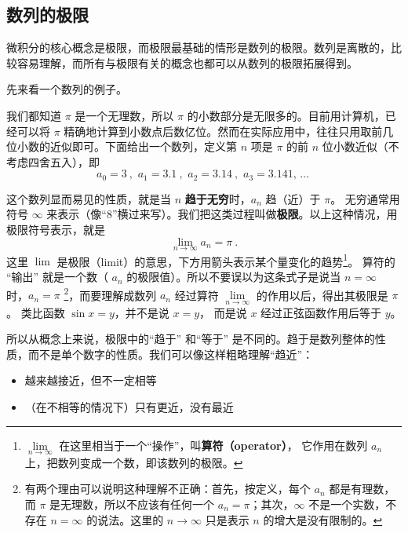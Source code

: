 

\subsection{数列的极限}

微积分的核心概念是极限，而极限最基础的情形是数列的极限。数列是离散的，比较容易理解，而所有与极限有关的概念也都可以从数列的极限拓展得到。

先来看一个数列的例子。

\begin{example}{}\label{ex_Lim_1}
我们都知道 $\pi$ 是一个无理数，所以 $\pi$ 的小数部分是无限多的。目前用计算机，已经可以将 $\pi$ 精确地计算到小数点后数亿位。然而在实际应用中，往往只用取前几位小数的近似即可。下面给出一个数列，定义第 $n$ 项是 $\pi$ 的前 $n$ 位小数近似（不考虑四舍五入），即
\begin{equation}
a_0 = 3~,\,\, a_1 = 3.1~,\,\, a_2 = 3.14~,\,\, a_3 = 3.141,\,\dots~
\end{equation}
\end{example}

这个数列显而易见的性质，就是当 $n$ \textbf{趋于无穷}时，$a_n$ 趋（近）于 $\pi$。 无穷通常用符号 $\infty$ 来表示（像“8”横过来写）。我们把这类过程叫做\textbf{极限}。以上这种情况，用极限符号表示，就是
\begin{equation}
\lim_{n \to \infty } {a_n} = \pi ~.
\end{equation}
这里 $\lim$ 是极限（limit）的意思，下方用箭头表示某个量变化的趋势\footnote{$\lim\limits_{n \to \infty }$ 在这里相当于一个“操作”，叫\textbf{算符（operator）}， 它作用在数列 $a_n$ 上，把数列变成一个数，即该数列的极限。}。 算符的 “输出” 就是一个数（ $a_n$ 的极限值）。所以不要误以为这条式子是说当 $n = \infty$ 时，$a_n=\pi$ \footnote{有两个理由可以说明这种理解不正确：首先，按定义，每个 $a_n$ 都是有理数，而 $\pi$ 是无理数，所以不应该有任何一个 $a_n=\pi$；其次，$\infty$ 不是一个实数，不存在 $n=\infty$ 的说法。这里的 $n\to\infty$ 只是表示 $n$ 的增大是没有限制的。}，而要理解成数列 $a_n$ 经过算符 $\lim\limits_{n \to \infty }$ 的作用以后，得出其极限是 $\pi$。 类比函数 $\sin x = y$，并不是说 $x=y$， 而是说 $x$ 经过正弦函数作用后等于 $y$。 

所以从概念上来说，极限中的“趋于” 和“等于” 是不同的。趋于是数列整体的性质，而不是单个数字的性质。我们可以像这样粗略理解“趋近”：
\begin{itemize}
\item 越来越接近，但不一定相等
\item （在不相等的情况下）只有更近，没有最近
\end{itemize}

